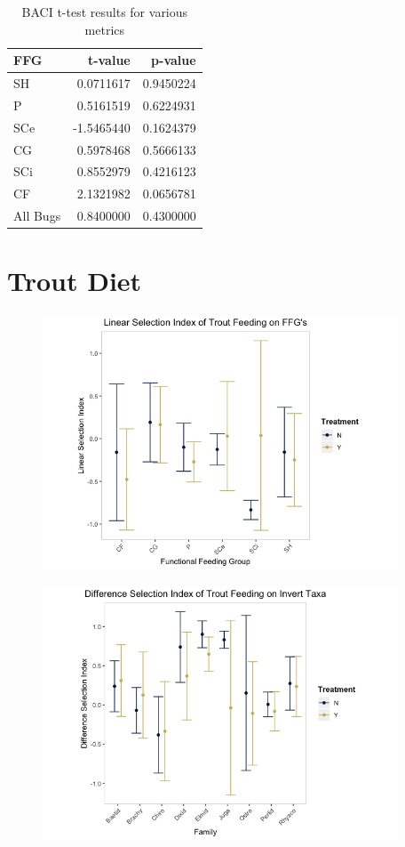 \documentclass[double,12pt]{beavtex}
\begin{document}
  \begin{table}[t]
  
  \caption{\label{tab:ffgtable}BACI t-test results for various metrics}
  \centering
  \begin{tabular}{lrr}
  \toprule
  FFG & t-value & p-value\\
  \midrule
  SH & 0.0711617 & 0.9450224\\
  P & 0.5161519 & 0.6224931\\
  SCe & -1.5465440 & 0.1624379\\
  CG & 0.5978468 & 0.5666133\\
  SCi & 0.8552979 & 0.4216123\\
  \addlinespace
  CF & 2.1321982 & 0.0656781\\
  All Bugs & 0.8400000 & 0.4300000\\
  \bottomrule
  \end{tabular}
  \end{table}
  
  \section*{Trout Diet}\label{trout-diet}
  
  \begin{figure}[htbp]
  \centering
  \includegraphics[width=4.16667in]{Figures/Diet-FFG-D-1.png}
  \caption{}
  \end{figure}
  
  \begin{figure}[htbp]
  \centering
  \includegraphics[width=4.16667in]{Figures/Diet-Fam-D-1.png}
  \caption{}
  \end{figure}
  
\end{document}
